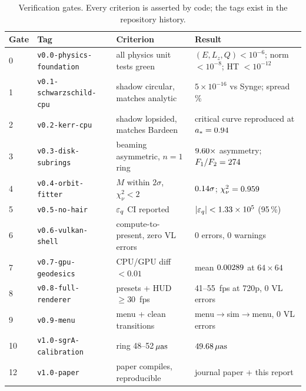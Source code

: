 \begin{table}
\centering
\caption{Verification gates. Every criterion is asserted by code; the
tags exist in the repository history.}
\label{tab:gates}
\footnotesize
\setlength{\tabcolsep}{4pt}
\begin{tabular}{llll}
\toprule
Gate & Tag & Criterion & Result \\
\midrule
0 & \texttt{v0.0-physics-foundation} & all physics unit tests green &
$(E,L_z,Q)<10^{-6}$; norm $<10^{-8}$; HT $<10^{-12}$ \\
1 & \texttt{v0.1-schwarzschild-cpu} & shadow circular, matches analytic &
$5\times10^{-16}$ vs Synge; spread \SchwSpreadPct{}\,\% \\
2 & \texttt{v0.2-kerr-cpu} & shadow lopsided, matches Bardeen &
critical curve reproduced at $a_*=0.94$ \\
3 & \texttt{v0.3-disk-subrings} & beaming asymmetric, $n=1$ ring &
$9.60\times$ asymmetry; $F_1/F_2 = 274$ \\
4 & \texttt{v0.4-orbit-fitter} & $M$ within $2\sigma$, $\chi^2_\nu<2$ &
$0.14\sigma$; $\chi^2_\nu = 0.959$ \\
5 & \texttt{v0.5-no-hair} & $\varepsilon_q$ CI reported &
$|\varepsilon_q| < 1.33\times10^{5}$ (95\,\%) \\
6 & \texttt{v0.6-vulkan-shell} & compute-to-present, zero VL errors &
0 errors, 0 warnings \\
7 & \texttt{v0.7-gpu-geodesics} & CPU/GPU diff $<0.01$ &
mean $0.00289$ at $64\times64$ \\
8 & \texttt{v0.8-full-renderer} & presets + HUD $\geq30$~fps &
41--55~fps at 720p, 0 VL errors \\
9 & \texttt{v0.9-menu} & menu + clean transitions &
menu$\to$sim$\to$menu, 0 VL errors \\
10 & \texttt{v1.0-sgrA-calibration} & ring 48--52\,$\mu\mathrm{as}$ &
$49.68\,\mu\mathrm{as}$ \\
12 & \texttt{v1.0-paper} & paper compiles, reproducible &
journal paper + this report \\
\bottomrule
\end{tabular}
\end{table}

